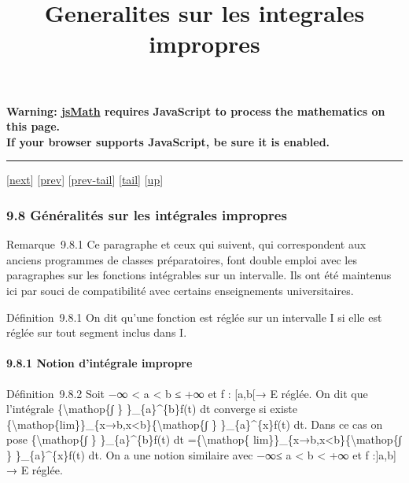 \documentclass[]{article}
\title{Generalites sur les integrales impropres}
\author{}
\date{}
\begin{document}
\maketitle

\textbf{Warning: \href{http://www.math.union.edu/locate/jsMath}{jsMath}
requires JavaScript to process the mathematics on this page.\\ If your
browser supports JavaScript, be sure it is enabled.}

\begin{center}\rule{3in}{0.4pt}\end{center}

{[}\href{coursse58.html}{next}{]} {[}\href{coursse56.html}{prev}{]}
{[}\href{coursse56.html\#tailcoursse56.html}{prev-tail}{]}
{[}\hyperref[tailcoursse57.html]{tail}{]}
{[}\href{coursch10.html\#coursse57.html}{up}{]}

\subsubsection{9.8 Généralités sur les intégrales impropres}

Remarque~9.8.1 Ce paragraphe et ceux qui suivent, qui correspondent aux
anciens programmes de classes préparatoires, font double emploi avec les
paragraphes sur les fonctions intégrables sur un intervalle. Ils ont été
maintenus ici par souci de compatibilité avec certains enseignements
universitaires.

Définition~9.8.1 On dit qu'une fonction est réglée sur un intervalle I
si elle est réglée sur tout segment inclus dans I.

\paragraph{9.8.1 Notion d'intégrale impropre}

Définition~9.8.2 Soit −∞ \textless{} a \textless{} b ≤ +∞ et f :
{[}a,b{[}→ E réglée. On dit que l'intégrale \{\textbackslash{}mathop\{∫
\} \}\_\{a\}\^{}\{b\}f(t) dt converge si existe
\{\textbackslash{}mathop\{lim\}\}\_\{x→b,x\textless{}b\}\{\textbackslash{}mathop\{∫
\} \}\_\{a\}\^{}\{x\}f(t) dt. Dans ce cas on pose
\{\textbackslash{}mathop\{∫ \} \}\_\{a\}\^{}\{b\}f(t) dt
=\{\textbackslash{}mathop\{
lim\}\}\_\{x→b,x\textless{}b\}\{\textbackslash{}mathop\{∫ \}
\}\_\{a\}\^{}\{x\}f(t) dt. On a une notion similaire avec −∞≤ a
\textless{} b \textless{} +∞ et f :{]}a,b{]} → E réglée.
\end{document}
